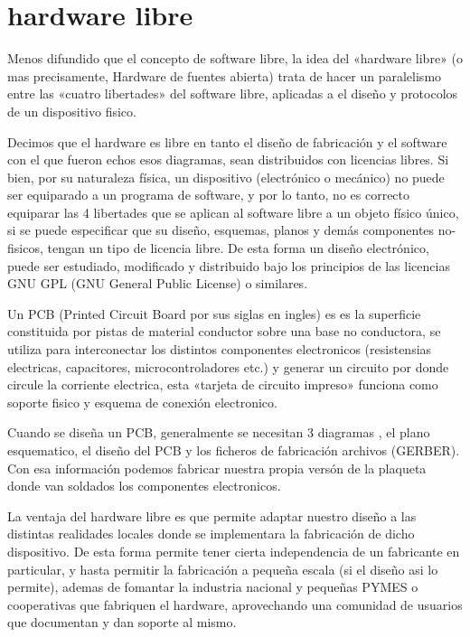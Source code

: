 \documentclass[letterpaper,10pt,english]{sphinxmanual}
\begin{document}
\section{hardware libre}
\label{introduccion:hardware-libre}
Menos difundido que el concepto de software libre, la idea del «hardware libre»
(o mas precisamente, Hardware de fuentes abierta) trata de hacer un paralelismo
entre las «cuatro libertades» del software libre, aplicadas a el diseño y protocolos de
un dispositivo fisico.

Decimos que el hardware es libre en tanto el diseño de fabricación y
el software con el que fueron echos esos diagramas, sean distribuidos con licencias libres.
Si bien, por su naturaleza física, un dispositivo (electrónico o mecánico) no puede ser
equiparado a un programa de software, y por lo tanto, no es correcto equiparar
las 4 libertades que se aplican al software libre a un objeto físico único,
si se puede especificar que su diseño, esquemas, planos y demás componentes no-fisicos,
tengan un tipo de licencia libre. De esta forma un diseño electrónico, puede ser estudiado,
modificado y distribuido bajo los principios de las licencias GNU GPL
(GNU General Public License) o similares.

Un PCB (Printed Circuit Board por sus siglas en ingles)
es es la superficie constituida por pistas de material conductor
sobre una base no conductora, se utiliza para interconectar los
distintos componentes electronicos
(resistensias electricas, capacitores, microcontroladores etc.) y
generar un circuito por donde circule la corriente electrica, esta
«tarjeta de circuito impreso» funciona como soporte fisico y esquema de
conexión electronico.

Cuando se diseña un PCB, generalmente se necesitan 3 diagramas ,
el plano esquematico, el diseño del PCB y los ficheros de fabricación
archivos (GERBER). Con esa información podemos fabricar nuestra propia
versón de la plaqueta donde van soldados los componentes electronicos.

La ventaja del hardware libre es que permite adaptar nuestro diseño a
las distintas realidades locales donde se implementara la fabricación
de dicho dispositivo. De esta forma permite tener cierta independencia
de un fabricante en particular, y hasta permitir la fabricación a
pequeña escala (si el diseño asi lo permite), ademas de fomantar la
industria nacional y pequeñas PYMES o cooperativas que fabriquen el
hardware, aprovechando una comunidad de usuarios que
documentan y dan soporte al mismo.
\end{document}
